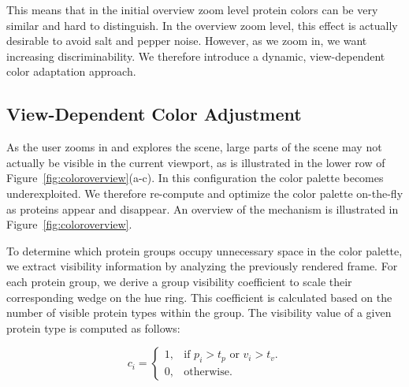 \documentclass{egpubl}
\begin{document}
	
	This means that in the initial overview zoom level protein colors can be very similar and hard to distinguish. 
	In the overview zoom level, this effect is actually desirable to avoid salt and pepper noise. 
	However, as we zoom in, we want increasing discriminability. 
	We therefore introduce a dynamic, view-dependent color adaptation approach. 
	
	\subsection{View-Dependent Color Adjustment}
	\label{sec:dynamic}
	
	As the user zooms in and explores the scene, large parts of the scene may not actually be visible in the current viewport, as is illustrated in the lower row of Figure~\ref{fig:coloroverview}(a-c).
	In this configuration the color palette becomes underexploited. %
	We therefore re-compute and optimize the color palette on-the-fly as proteins appear and disappear.
	An overview of the mechanism is illustrated in Figure~\ref{fig:coloroverview}.
	
	
	To determine which protein groups occupy unnecessary space in the color palette, we extract visibility information by analyzing the previously rendered frame.
	For each protein group, we derive a group visibility coefficient to scale their corresponding wedge on the hue ring. 
	This coefficient is calculated based on the number of visible protein types within the group. 
	The visibility value of a given protein type is computed as follows:
	
	\begin{equation}
	c_{i}=\begin{cases}
	1, & \text{if $p_{i}>t_{p}$ or $v_{i}>t_{v}$}.\\
	0, & \text{otherwise}.
	\end{cases}
	\end{equation}
	
\end{document}
